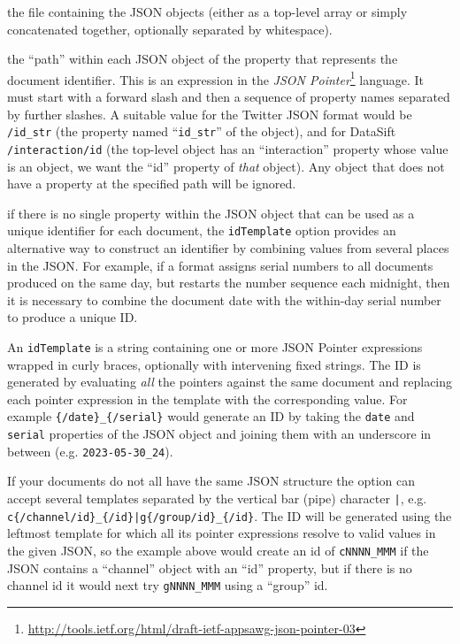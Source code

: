 \bde
\item[srcFile] the file containing the JSON objects (either as a top-level
  array or simply concatenated together, optionally separated by whitespace).
\item[idPointer] the ``path'' within each JSON object of the property that
  represents the document identifier.  This is an expression in the \emph{JSON
  Pointer}\footnote{\url{http://tools.ietf.org/html/draft-ietf-appsawg-json-pointer-03}}
  language.  It must start with a forward slash and then a sequence of property
  names separated by further slashes.  A suitable value for the Twitter JSON
  format would be \verb!/id_str! (the property named ``\verb!id_str!'' of the
  object), and for DataSift \verb!/interaction/id! (the top-level object has an
  ``interaction'' property whose value is an object, we want the ``id''
  property of \emph{that} object).  Any object that does not have a property at
  the specified path will be ignored.
\item[idTemplate] if there is no single property within the JSON object that
  can be used as a unique identifier for each document, the \verb!idTemplate!
  option provides an alternative way to construct an identifier by combining
  values from several places in the JSON.  For example, if a format assigns
  serial numbers to all documents produced on the same day, but restarts the
  number sequence each midnight, then it is necessary to combine the document
  date with the within-day serial number to produce a unique ID.

  An
  \verb!idTemplate! is a string containing one or more JSON Pointer
  expressions wrapped in curly braces, optionally with intervening fixed
  strings.  The ID is generated by evaluating \emph{all} the pointers against
  the same document and replacing each pointer expression in the template with
  the corresponding value.  For example \verb!{/date}_{/serial}! would
  generate an ID by taking the \verb!date! and \verb!serial! properties of the
  JSON object and joining them with an underscore in between (e.g.
  \verb!2023-05-30_24!).

  If your documents do not all have the same JSON structure the option can
  accept several templates separated by the vertical bar (pipe) character
  \verb!|!, e.g.\,\verb!c{/channel/id}_{/id}|g{/group/id}_{/id}!.  The ID
  will be generated using the leftmost template for which all its pointer
  expressions resolve to valid values in the given JSON, so the example above
  would create an id of \verb!cNNNN_MMM! if the JSON contains a ``channel''
  object with an ``id'' property, but if there is no channel id it would
  next try \verb!gNNNN_MMM! using a ``group'' id.

